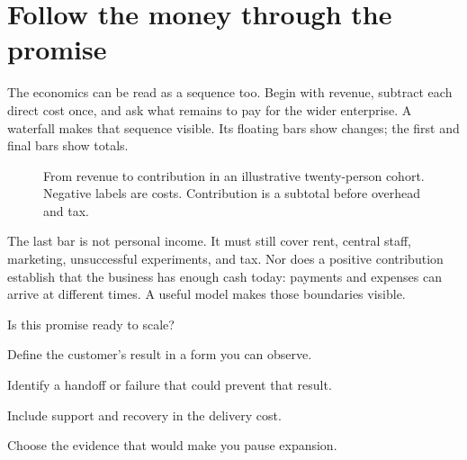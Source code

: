 \documentclass[11pt,twoside,openright]{book}
\begin{document}
\section{Follow the money through the promise}
The economics can be read as a sequence too. Begin with revenue, subtract each
direct cost once, and ask what remains to pay for the wider enterprise. A
waterfall makes that sequence visible. Its floating bars show changes; the
first and final bars show totals.

\begin{figure}[H]
\centering
{}
\caption{From revenue to contribution in an illustrative twenty-person cohort.
Negative labels are costs. Contribution is a subtotal before overhead and tax.}
\end{figure}

The last bar is not personal income. It must still cover rent, central staff,
marketing, unsuccessful experiments, and tax. Nor does a positive contribution
establish that the business has enough cash today: payments and expenses can
arrive at different times. A useful model makes those boundaries visible.

\begin{DecisionChecklist}{Is this promise ready to scale?}
\item Define the customer's result in a form you can observe.
\item Identify a handoff or failure that could prevent that result.
\item Include support and recovery in the delivery cost.
\item Choose the evidence that would make you pause expansion.
\end{DecisionChecklist}
\end{document}
